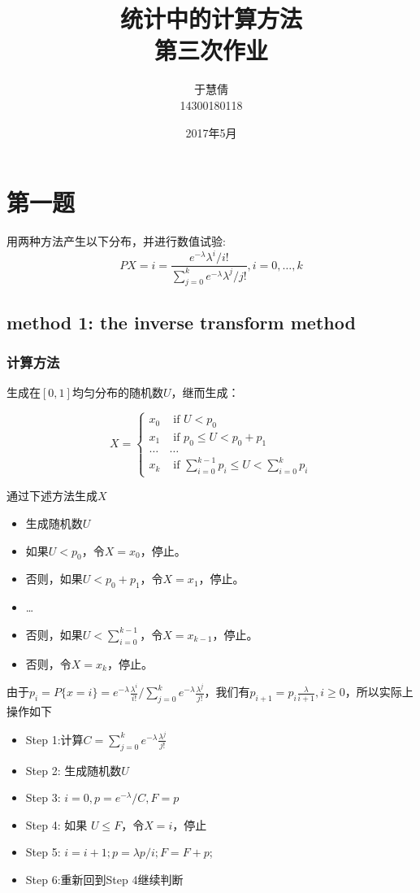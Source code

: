 \documentclass{ctexart}
\title{统计中的计算方法 \\ 第三次作业}
\author{于慧倩 \\ 14300180118}
\date{2017年5月}
\begin{document}
\maketitle

\newpage



\section{第一题}

用两种方法产生以下分布，并进行数值试验:
\[ P{X=i} = \frac{e^{-\lambda}\lambda^i/i!}{\sum_{j=0}^{k} e^{-\lambda} \lambda^j/j!},  i=0,\dots,k \]

\subsection{method 1: the inverse transform method}
 \subsubsection{计算方法}
生成在\([0,1]\)均匀分布的随机数\(U\)，继而生成：

\[
X = \left\{ \begin{array}{rl}
  x_0 &\mbox{ if \(U<p_0\)} \\
  x_1 &\mbox{ if \(p_0 \leq U < p_0+p_1\)} \\
  \dots &\dots \\
  x_k  &\mbox{ if \(\sum_{i=0}^{k-1}p_i \leq U < \sum_{i=0}^k p_i\)}
       \end{array} \right.
\]

通过下述方法生成\(X\)

\begin{itemize} 
\item 生成随机数\(U\)
\item 如果\(U < p_0\)，令\(X=x_0\)，停止。
\item 否则，如果\(U < p_0+p_1\)，令\(X=x_1\)，停止。
\item \dots
\item 否则，如果\(U < \sum_{i=0}^{k-1}\)，令\(X=x_{k-1}\)，停止。
\item 否则，令\(X=x_k\)，停止。
\end{itemize}

由于\(p_i=P\{x=i\}=e^{-\lambda} \frac{\lambda^i}{i!}/ \sum_{j=0}^k e^{-\lambda} \frac{\lambda^j}{j!}\)，我们有\(p_{i+1}=p_i \frac{\lambda}{i+1}, i\geq 0\)，所以实际上操作如下

\begin{itemize} 
\item Step 1:计算\(C=\sum_{j=0}^k e^{-\lambda} \frac{\lambda^j}{j!}\)
\item Step 2: 生成随机数\(U\)
\item Step 3: \(i=0,p=e^{-\lambda}/C,F=p\)
\item Step 4: 如果 \(U \leq F\)，令\(X=i\)，停止
\item Step 5: \(i=i+1;p=\lambda p/i;F=F+p\);
\item Step 6:重新回到Step 4继续判断
\end{itemize}
\end{document}
